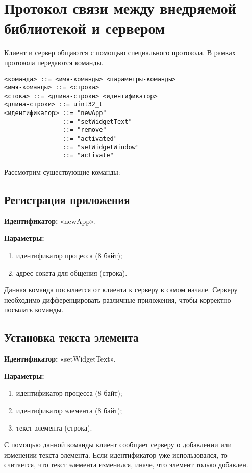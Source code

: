 \section{Протокол связи между внедряемой библиотекой и сервером}

Клиент и сервер общаются с помощью специального протокола. В рамках протокола
передаются команды.

\begin{verbatim}
<команда> ::= <имя-команды> <параметры-команды>
<имя-команды> ::= <строка>
<стока> ::= <длина-строки> <идентификатор>
<длина-строки> ::= uint32_t
<идентификатор> ::= "newApp"
                ::= "setWidgetText"
                ::= "remove"
                ::= "activated"
                ::= "setWidgetWindow"
                ::= "activate"
\end{verbatim}

Рассмотрим существующие команды:

\subsection{Регистрация приложения}

\textbf{Идентификатор:} «newApp».

\textbf{Параметры:}
\begin{enumerate}
\item идентификатор процесса (8 байт);
\item адрес сокета для общения (строка).
\end{enumerate}

Данная команда посылается от клиента к серверу в самом начале. Серверу
необходимо дифференцировать различные приложения, чтобы корректно посылать
команды.

\subsection{Установка текста элемента}

\textbf{Идентификатор:} «setWidgetText».

\textbf{Параметры:}
\begin{enumerate}
\item идентификатор процесса (8 байт);
\item идентификатор элемента (8 байт);
\item текст элемента (строка).
\end{enumerate}

С помощью данной команды клиент сообщает серверу о добавлении или изменении
текста элемента. Если идентификатор уже использовался, то считается, что текст
элемента изменился, иначе, что элемент только добавлен.

